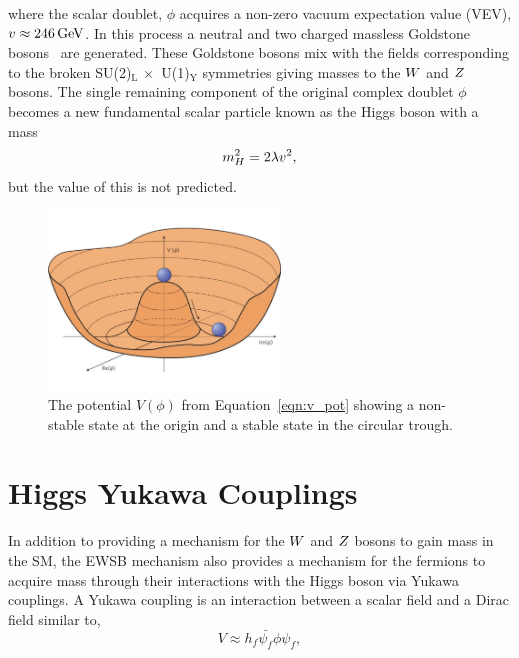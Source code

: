 where the scalar doublet, $\phi$ acquires a non-zero vacuum expectation value (VEV), $v \approx 246\,\mathrm{GeV}$.
In this process a neutral and two charged massless Goldstone bosons~\cite{PhysRev.127.965} are generated. These Goldstone
bosons mix with the fields corresponding to the broken SU(2)$_{\text{L}} \,\times\,$ U(1)$_{\text{Y}}$
symmetries giving masses to the $W$ and $Z$ bosons. The single remaining component of the
original complex doublet $\phi$ becomes a new fundamental scalar particle 
known as the Higgs boson with a mass
\begin{equation}
m_{H}^{2} = 2\lambda v^2,
\end{equation}
but the value of this is not predicted.


\begin{figure}[htbp]
\centering
     \includegraphics[width=0.55\textwidth]{phenomenology_of_processes/plots/higgs_potential.pdf}
     \caption{
The potential $V\left(\phi\right)$ from Equation~\ref{eqn:v_pot} showing a non-stable state
at the origin and a stable state in the circular trough.
     }
     \label{fig:higgs_potential}
\end{figure}



\section{Higgs Yukawa Couplings}
In addition to providing a mechanism for the $W$ and $Z$ bosons to gain mass in the SM, the EWSB mechanism also
provides a mechanism for the fermions to acquire mass through their interactions with the Higgs boson
via Yukawa couplings. A Yukawa coupling is an interaction between a scalar field and a Dirac field
similar to,
\begin{equation}
V \approx h_{f}\bar{\psi_{f}}\phi\psi_{f},
\end{equation}

